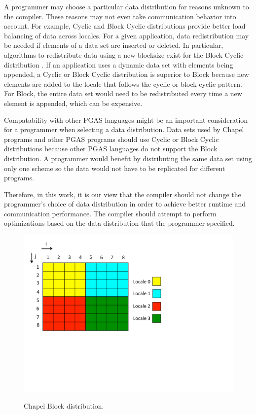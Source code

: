 A programmer may choose a particular data distribution for reasons unknown to the compiler. These reasons may not even take communication behavior into account. For example, Cyclic and Block Cyclic distributions provide better load balancing of data across locales. For a given application, data redistribution may be needed if elements of a data set are inserted or deleted. In particular, algorithms to redistribute data using a new blocksize exist for the Block Cyclic distribution \cite{walker1996redistribution, prylli1997fast}. If an application uses a dynamic data set with elements being appended, a Cyclic or Block Cyclic distribution is superior to Block because new elements are added to the locale that follows the cyclic or block cyclic pattern. For Block, the entire data set would need to be redistributed every time a new element is appended, which can be expensive. 

Compatability with other PGAS languages might be an important consideration for a programmer when selecting a data distribution. Data sets used by Chapel programs and other PGAS programs should use Cyclic or Block Cyclic distributions because other PGAS languages do not support the Block distribution. A programmer would benefit by distributing the same data set using only one scheme so the data would not have to be replicated for different programs. 

Therefore, in this work, it is our view that the compiler should not change the programmer's choice of data distribution in order to achieve better runtime and communication performance. The compiler should attempt to perform optimizations based on the data distribution that the programmer specified. 

\begin{figure}
	\begin{center}
	\includegraphics[scale=0.55]{./Figures/block_dist}
	\label{block_dist}
	\end{center}
	\caption{Chapel Block distribution.}
\end{figure}

